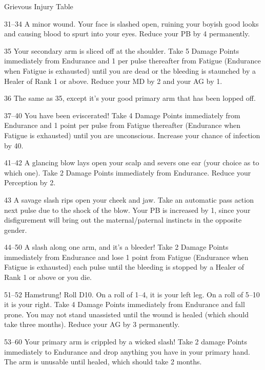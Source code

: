 \begin{Chapter}{Grievous Injury Table}
\begin{Description}
\item[31–34] A minor wound. Your face is slashed open, ruining your
  boyish good looks and causing blood to spurt into your eyes.  Reduce
  your PB by 4 permanently.

\item[35] Your secondary arm is sliced off at the shoulder. Take 5
  Damage Points immediately from Endurance and 1 per pulse thereafter
  from Fatigue (Endurance when Fatigue is exhausted) until you are
  dead or the bleeding is staunched by a Healer of Rank 1 or
  above. Reduce your MD by 2 and your AG by 1.

\item[36] The same as 35, except it’s your good primary arm that has
  been lopped off.

\item[37–40] You have been eviscerated! Take 4 Damage Points
  immediately from Endurance and 1 point per pulse from Fatigue
  thereafter (Endurance when Fatigue is exhausted) until you are
  unconscious. Increase your chance of infection by 40.

\item[41–42] A glancing blow lays open your scalp and severs one ear
  (your choice as to which one). Take 2 Damage Points immediately from
  Endurance. Reduce your Perception by 2.

\item[43] A savage slash rips open your cheek and jaw. Take an
  automatic pass action next pulse due to the shock of the blow. Your
  PB is increased by 1, since your disfigurement will bring out the
  maternal/paternal instincts in the opposite gender.

\item[44–50] A slash along one arm, and it’s a bleeder!  Take 2 Damage
  Points immediately from Endurance and lose 1 point from Fatigue
  (Endurance when Fatigue is exhausted) each pulse until the bleeding
  is stopped by a Healer of Rank 1 or above or you die.

\item[51–52] Hamstrung! Roll D10. On a roll of 1–4, it is your left
  leg. On a roll of 5–10 it is your right. Take 4 Damage Points
  immediately from Endurance and fall prone. You may not stand
  unassisted until the wound is healed (which should take three
  months).  Reduce your AG by 3 permanently.

\item[53–60] Your primary arm is crippled by a wicked slash! Take 2
  damage Points immediately to Endurance and drop anything you have in
  your primary hand. The arm is unusable until healed, which should
  take 2 months.


\end{Description}
\end{Chapter}
